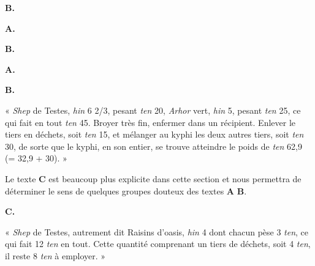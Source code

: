 \documentclass[a4paper, 11pt, oneside]{article}
\newcommand*\hieroAAAE{}
\newcommand*\hieroAAAL{}
\newcommand*\hieroAAAM{}
\newcommand*\hieroAAAR{}
\newcommand*\hieroAACQ{}
\newcommand*\hieroAACY{}
\newcommand*\hieroAADL{}
\newcommand*\hieroAAEP{\raisebox{0.5ex}{}}
\newcommand*\hieroAAEQ{}
\newcommand*\hieroAAFI{}
\newcommand*\hieroAAFM{}
\newcommand*\hieroAAFT{}
\newcommand*\hieroAAGA{}
\newcommand*\hieroAAGN{}
\newcommand*\hieroAAHH{}
\newcommand*\hieroAAHT{}
\newcommand*\hieroAAIE{}
\newcommand*\hieroAAIF{}
\newcommand*\hieroAAIG{}
\newcommand*\hieroAAIT{}
\newcommand*\hieroAAIU{}
\newcommand*\hieroAAJA{}
\newcommand*\hieroAAJB{}
\newcommand*\hieroAAJG{}
\newcommand*\hieroAAJI{}
\newcommand*\hieroAALP{}
\newcommand*\hieroAAMQ{}
\newcommand*\hieroAAMV{}
\newcommand*\hieroAAMX{}
\newcommand*\hieroAANQ{}
\newcommand*\hieroAAOI{}
\newcommand*\hieroAAOJ{}
\newcommand*\hieroAAOK{}
\newcommand*\hieroAAOL{}
\newcommand*\hieroAAOM{}
\newcommand*\hieroAAON{}
\newcommand*\hieroAAOO{}
\newcommand*\hieroAAOP{}
\newcommand*\hieroAAOQ{}
\newcommand*\hieroAAOR{}
\newcommand*\hieroAAOS{}
\newcommand*\hieroAAOT{}
\newcommand*\hieroAAOU{}
\newcommand*\hieroAAOV{}
\newcommand*\hieroAAOW{}
\newcommand*\hieroAAOX{}
\newcommand*\hieroAAOY{}
\newcommand*\hieroAAOZ{}
\newcommand*\hieroAAPA{}
\newcommand*\hieroAAPB{}
\newcommand*\hieroAAPC{}
\newcommand*\hieroAAPD{}
\newcommand*\hieroAAPE{}
\newcommand*\hieroAAPF{}
\newcommand*\hieroAAPG{}
\newcommand*\hieroAAPH{}
\newcommand*\hieroAAPI{}
\begin{document}
\hspace*{10mm}\textbf{B.}\hspace*{5mm} $\hieroAAGN\:\hieroAAFT\:\hieroAALP\:\hieroAAGN\:\hieroAAFT\:\hieroAAMQ\:\hieroAALP$

\hspace*{10mm}\textbf{A.}\hspace*{5mm} $\hieroAAOI\:\hieroAAOJ\:\hieroAAOK\:\hieroAAOL\:\hieroAAIT\:\hieroAAIE\:\hieroAACQ\:\hieroAAIG\:\hieroAAOM\:\hieroAAAE\:\hieroAAAR\:\hieroAAIT\:\hieroAAON\:\hieroAAGN$

\hspace*{10mm}\textbf{B.}\hspace*{5mm} $\hieroAAJI\:\hieroAAEP\:\hieroAAOO\:\hieroAAOP\:\hieroAAAM\:\hieroAAAM\:\hieroAADL\:\hieroAAOQ\:\hieroAANQ\:\hieroAAIE\:\hieroAACQ\:\hieroAAIG\:\hieroAAOR\:\hieroAAOS\:\hieroAAOT\:\hieroAAON$

\hspace*{10mm}\textbf{A.}\hspace*{5mm} $\hieroAAAE\:\hieroAAAR\:\hieroAAOU\:\hieroAAMQ\:\hieroAAIU\:\hieroAAGA\:\hieroAAOV$

\hspace*{10mm}\textbf{B.}\hspace*{5mm} $\hieroAAGN\:\hieroAAAE\:\hieroAAEQ\:\hieroAAFT\:\hieroAAMQ\:\hieroAAMQ\:\hieroAAMQ\:\hieroAAIF\:\hieroAAJA\:\hieroAAJB\:\hieroAAOW$

« \emph{Shep} de Testes, \emph{hin} 6 2/3, pesant \emph{ten} 20, \emph{Arhor} vert, \emph{hin} 5, pesant \emph{ten} 25, ce qui fait en tout \emph{ten} 45. Broyer très fin, enfermer dans un récipient. Enlever le tiers en déchets, soit \emph{ten} 15, et mélanger au kyphi les deux autres tiers, soit \emph{ten} 30, de sorte que le kyphi, en son entier, se trouve atteindre le poids de \emph{ten} 62,9 (= 32,9 + 30). »

Le texte \textbf{C} est beaucoup plus explicite dans cette section et nous permettra de déterminer le sens de quelques groupes douteux des textes \textbf{A} \textbf{B}.

\hspace*{10mm}\textbf{C.}\hspace*{5mm} $\hieroAAOX\:\hieroAAOY\:\hieroAAOZ\:\hieroAAHH\:\hieroAAAM\:\hieroAAPA\:\hieroAAAL\:\hieroAAPB\:\hieroAAHT\:\hieroAAPC\:\hieroAAMV\:\hieroAAFM\:\hieroAAMX\:\hieroAAPD\:\hieroAAFI\:\hieroAAPE\:\hieroAAPF\:\hieroAAPG\:\hieroAACY\:\hieroAAAR\:\hieroAAPH\:\hieroAAPI\:\hieroAAJG$

« \emph{Shep} de Testes, autrement dit Raisins d'oasis, \emph{hin} 4 dont chacun pèse 3 \emph{ten}, ce qui fait 12 \emph{ten} en tout. Cette quantité comprenant un tiers de déchets, soit 4 \emph{ten}, il reste 8 \emph{ten} à employer. »
\end{document}
